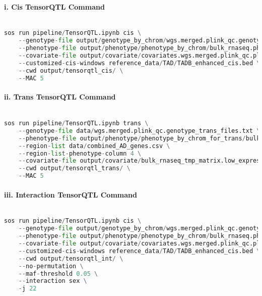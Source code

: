 \documentclass[12pt]{article}
\begin{document}
\paragraph*{i. Cis TensorQTL Command}


\noindent
\begin{lstlisting}[language=Python]

sos run pipeline/TensorQTL.ipynb cis \
    --genotype-file output/genotype_by_chrom/wgs.merged.plink_qc.genotype_by_chrom_files.txt \
    --phenotype-file output/phenotype/phenotype_by_chrom/bulk_rnaseq.phenotype_by_chrom_files.txt \
    --covariate-file output/covariate/covariates.wgs.merged.plink_qc.plink_qc.prune.pca.gz \
    --customized-cis-windows reference_data/TAD/TADB_enhanced_cis.bed \
    --cwd output/tensorqtl_cis/ \
    --MAC 5

\end{lstlisting}




\paragraph*{ii. Trans TensorQTL Command}


\noindent
\begin{lstlisting}[language=Python]

sos run pipeline/TensorQTL.ipynb trans \
    --genotype-file data/wgs.merged.plink_qc.genotype_trans_files.txt \
    --phenotype-file output/phenotype/phenotype_by_chrom_for_trans/bulk_rnaseq.phenotype_by_chrom_files.txt \
    --region-list data/combined_AD_genes.csv \
    --region-list-phenotype-column 4 \
    --covariate-file output/covariate/bulk_rnaseq_tmp_matrix.low_expression_filtered.outlier_removed.tmm.expression.covariates.wgs.merged.plink_qc.plink_qc.prune.pca.Marchenko_PC.gz \
    --cwd output/tensorqtl_trans/ \
    --MAC 5

\end{lstlisting}




\paragraph*{iii. Interaction TensorQTL Command}


\noindent
\begin{lstlisting}[language=Python]

sos run pipeline/TensorQTL.ipynb cis \
    --genotype-file output/genotype_by_chrom/wgs.merged.plink_qc.genotype_by_chrom_files.txt \
    --phenotype-file output/phenotype/phenotype_by_chrom/bulk_rnaseq.phenotype_by_chrom_files.txt \
    --covariate-file output/covariate/covariates.wgs.merged.plink_qc.plink_qc.prune.pca.gz \
    --customized-cis-windows reference_data/TAD/TADB_enhanced_cis.bed \
    --cwd output/tensorqtl_int/ \
    --no-permutation \
    --maf-threshold 0.05 \
    --interaction sex \
    -j 22

\end{lstlisting}
\end{document}
